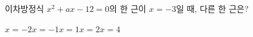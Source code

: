 이차방정식 $x^2+ax-12=0$의 한 근이 $x=-3$일 때, 다른 한 근은? 
\begin{choices32}{$x=-2$}{$x=-1$}{$x=1$}{$x=2$}{$x=4$}\end{choices32}

